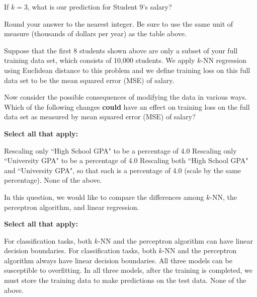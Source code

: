 \documentclass[11pt,addpoints,answers]{exam}
\numberwithin{equation}{section} %
\numberwithin{figure}{section} %
\numberwithin{table}{section} %
\begin{document}
\begin{questions}
    If $k=3$, what is our prediction for Student 9's salary?
    
    Round your answer to the nearest integer. Be sure to use the same unit of measure (thousands of dollars per year) as the table above.
    
    \begin{tcolorbox}[fit,height=1cm, width=4cm, blank, borderline={1pt}{-2pt},nobeforeafter, top=2pt, left=2pt, right=2pt, bottom=2pt]
    \end{tcolorbox}
    
    

\newpage
    \question[3] Suppose that the first 8 students shown above are only a subset of your full training data set, which consists of 10,000 students. We apply $k$-NN regression using Euclidean distance to this problem and we define training loss on this full data set to be the mean squared error (MSE) of salary.

    Now consider the possible consequences of modifying the data in various ways. Which of the following changes \textbf{could} have an effect on training loss on the full data set as measured by mean squared error (MSE) of salary?
    
    
        
    \textbf{Select all that apply:}
    {
    \checkboxchar{$\Box$} \checkedchar{$\blacksquare$}
    \begin{checkboxes}
        \choice Rescaling only ``High School GPA" to be a percentage of 4.0
        \choice Rescaling only ``University GPA" to be a percentage of 4.0
        \choice Rescaling both ``High School GPA" and ``University GPA", so that each is a percentage of 4.0 (scale by the same percentage).
        \choice None of the above.
    \end{checkboxes}
    }

    
    
    \question[2] In this question, we would like to compare the differences among $k$-NN, the perceptron algorithm, and linear regression.
    
    {
    \checkboxchar{$\Box$} \checkedchar{$\blacksquare$}
    \textbf{Select all that apply:}
    \begin{checkboxes}
        \choice For classification tasks, both $k$-NN and the perceptron algorithm can have linear decision boundaries.
        \choice For classification tasks, both $k$-NN and the perceptron algorithm always have linear decision boundaries.
        \choice All three models can be susceptible to overfitting.
        \choice In all three models, after the training is completed, we must store the training data to make predictions on the test data.
        \choice None of the above.
    \end{checkboxes}
    }


\end{questions}
\end{document}
